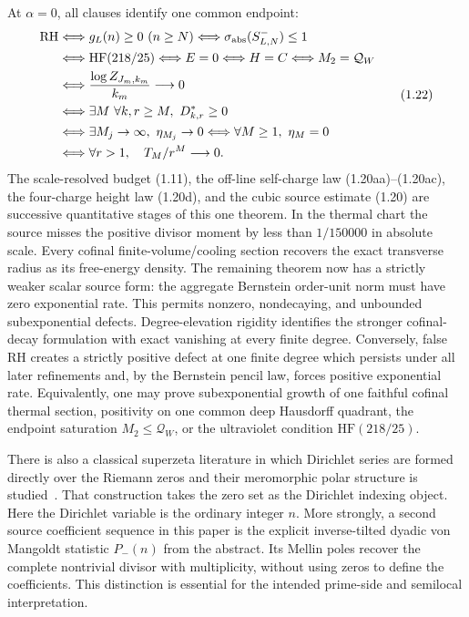 \documentclass[11pt]{article}
\begin{document}
At $\alpha=0$, all clauses identify one common endpoint:
\[
 \begin{aligned}
 \mathrm{RH}
 &\Longleftrightarrow g_L(n)\ge0\ (n\ge N)
 \Longleftrightarrow \sigma_{\rm abs}(S_{L,N}^-)\le1\\
 &\Longleftrightarrow \mathrm{HF}(218/25)
 \Longleftrightarrow E=0
 \Longleftrightarrow H=C
 \Longleftrightarrow M_2=\mathcal Q_W\\
 &\Longleftrightarrow
 \frac{\log Z_{J_m,k_m}}{k_m}\longrightarrow0\\
 &\Longleftrightarrow
 \exists M\ \forall k,r\ge M,\ D^*_{k,r}\ge0\\
 &\Longleftrightarrow
 \exists M_j\to\infty,\ \eta_{M_j}\to0
 \Longleftrightarrow \forall M\ge1,\ \eta_M=0\\
 &\Longleftrightarrow
 \forall r>1,\quad T_M/r^M\longrightarrow0.
 \end{aligned}
 \tag{1.22}
\]
The scale-resolved budget \textup{(1.11)}, the off-line self-charge law
\textup{(1.20aa)}--\textup{(1.20ac)}, the four-charge height law \textup{(1.20d)}, and the
cubic source estimate \textup{(1.20)} are successive quantitative stages of this one theorem.
In the thermal chart the source misses the positive divisor moment by less than $1/150000$ in
absolute scale.  Every cofinal finite-volume/cooling section recovers the exact transverse radius
as its free-energy density.  The remaining theorem now has a strictly weaker scalar source form:
the aggregate Bernstein order-unit norm must have zero exponential rate.  This permits nonzero,
nondecaying, and unbounded subexponential defects.  Degree-elevation rigidity identifies the
stronger cofinal-decay formulation with exact vanishing at every finite degree.  Conversely,
false RH creates a strictly positive defect at one finite degree which persists under all later
refinements and, by the Bernstein pencil law, forces positive exponential rate.
Equivalently, one may prove subexponential growth of one faithful cofinal thermal section,
positivity on one common deep Hausdorff quadrant, the endpoint saturation
$M_2\le\mathcal Q_W$, or the ultraviolet condition $\mathrm{HF}(218/25)$.

There is also a classical superzeta literature in which Dirichlet series are formed directly over
the Riemann zeros and their meromorphic polar structure is studied~\cite{Voros2003}.  That
construction takes the zero set as the Dirichlet indexing object.  Here the Dirichlet variable is
the ordinary integer $n$.  More strongly, a second source coefficient sequence in this paper is
the explicit inverse-tilted dyadic von Mangoldt statistic $P_-(n)$ from the abstract.  Its Mellin
poles recover the complete nontrivial divisor with multiplicity, without using zeros to define the coefficients.  This
distinction is essential for the intended prime-side and semilocal interpretation.
\end{document}
